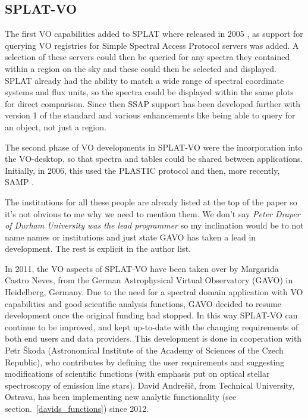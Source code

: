 \documentclass[final,authoryear,5p,times,twocolumn]{elsarticle}
\begin{document}
\subsection{SPLAT-VO}

The first VO capabilities added to SPLAT where released in 2005
\citep{2005ASPC..347...22D}, as support for querying VO registries for
Simple Spectral Access Protocol servers was added. A selection of
these servers could then be queried for any spectra they contained
within a region on the sky and these could then be selected and
displayed. SPLAT already had the ability to match a wide range of
spectral coordinate systems and flux units, so the spectra could be
displayed within the same plots for direct comparison. Since then SSAP
support has been developed further with version 1 of the standard and
various enhancements like being able to query for an object, not just
a region.

The second phase of VO developments in SPLAT-VO were the incorporation
into the VO-desktop, so that spectra and tables could be shared
between applications.  Initially, in 2006, this used the PLASTIC
\citep{2007ASPC..376..511T} protocol and then, more recently, SAMP
\citep{2012ASPC..461..279T}.


{\color{red}
The institutions for all these people are already listed at the
top of the paper so it's not obvious to me why we need to mention
them. We don't say \emph{Peter Draper of Durham University was the lead
programmer} so my inclination would be to not name names or
institutions and just state GAVO has taken a lead in development. The
rest is explicit in the author list.
}

In 2011, the VO aspects of SPLAT-VO have been taken over by Margarida
Castro Neves, from the German Astrophysical Virtual Observatory (GAVO) in
Heidelberg, Germany.  Due to the need for a spectral domain application with
VO capabilities and good scientific analysis functions, GAVO  decided to resume
development once the original funding had stopped. In this way SPLAT-VO can
continue to be improved, and kept up-to-date with the changing requirements of
both end users and data providers.  This development  is done in cooperation
with Petr \v{S}koda (Astronomical Institute of the Academy of Sciences of the
Czech Republic), who contributes by defining the user requirements and
suggesting modifications of scientific functions (with emphasis put on optical
stellar spectroscopy of  emission line stars).  David Andre\v{s}i\v{c},
from Technical University, Ostrava, has been implementing new analytic
functionality (see section.~\ref{davids_functions}) since 2012.
\end{document}
